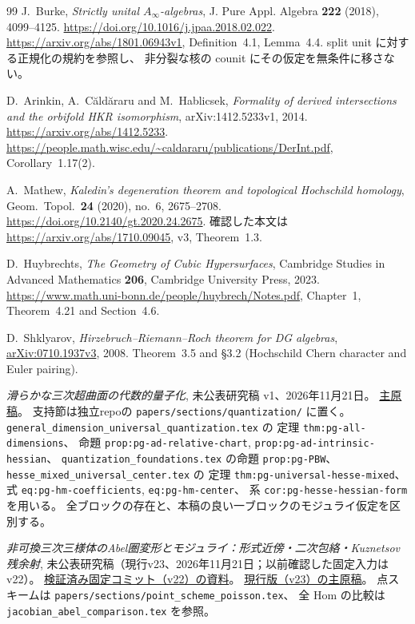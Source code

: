 \begin{thebibliography}{99}
J.~Burke,
\emph{Strictly unital $A_\infty$-algebras},
J. Pure Appl. Algebra \textbf{222} (2018), 4099--4125.
\url{https://doi.org/10.1016/j.jpaa.2018.02.022}.
\url{https://arxiv.org/abs/1801.06943v1},
Definition~4.1, Lemma~4.4.
split unit に対する正規化の規約を参照し、
非分裂な核の counit にその仮定を無条件に移さない。

D.~Arinkin, A.~C\u{a}ld\u{a}raru and M.~Hablicsek,
\emph{Formality of derived intersections and the orbifold HKR isomorphism},
arXiv:1412.5233v1, 2014.
\url{https://arxiv.org/abs/1412.5233}.
\url{https://people.math.wisc.edu/~caldararu/publications/DerInt.pdf},
Corollary~1.17(2).

A.~Mathew,
\emph{Kaledin's degeneration theorem and topological Hochschild homology},
Geom.\ Topol.\ \textbf{24} (2020), no.~6, 2675--2708.
\url{https://doi.org/10.2140/gt.2020.24.2675}.
確認した本文は \url{https://arxiv.org/abs/1710.09045}, v3,
Theorem~1.3.

D.~Huybrechts,
\emph{The Geometry of Cubic Hypersurfaces},
Cambridge Studies in Advanced Mathematics \textbf{206},
Cambridge University Press, 2023.
\url{https://www.math.uni-bonn.de/people/huybrech/Notes.pdf},
Chapter~1, Theorem~4.21 and Section~4.6.

D.~Shklyarov,
\emph{Hirzebruch--Riemann--Roch theorem for DG algebras},
\href{https://arxiv.org/abs/0710.1937}{arXiv:0710.1937v3}, 2008.
Theorem~3.5 and \S3.2 (Hochschild Chern character and Euler pairing).

\emph{滑らかな三次超曲面の代数的量子化},
未公表研究稿 v1、2026年11月21日。
\href{https://github.com/uedakazushi/cubic-quantization/blob/main/papers/cubic-quantization.tex}{主原稿}。
支持節は独立repoの \texttt{papers/sections/quantization/} に置く。
\texttt{general\_dimension\_universal\_quantization.tex} の
定理 \texttt{thm:pg-all-dimensions}、
命題 \texttt{prop:pg-ad-relative-chart}, \texttt{prop:pg-ad-intrinsic-hessian}、
\texttt{quantization\_foundations.tex} の命題 \texttt{prop:pg-PBW}、
\texttt{hesse\_mixed\_universal\_center.tex} の
定理 \texttt{thm:pg-universal-hesse-mixed}、
式 \texttt{eq:pg-hm-coefficients}, \texttt{eq:pg-hm-center}、
系 \texttt{cor:pg-hesse-hessian-form}を用いる。
全ブロックの存在と、本稿の良い一ブロックのモジュライ仮定を区別する。

\emph{非可換三次三様体のAbel圏変形とモジュライ：形式近傍・二次包絡・Kuznetsov残余射},
未公表研究稿（現行v23、2026年11月21日；以前確認した固定入力はv22）。
\href{https://github.com/uedakazushi/nc-cubic-threefold/tree/6c35d2c84671c2538e61836a6bf3a511392eacce}{検証済み固定コミット（v22）の資料}。
\href{https://github.com/uedakazushi/nc-cubic-threefold/blob/main/papers/nc-cubic-threefold.tex}{現行版（v23）の主原稿}。
点スキームは \texttt{papers/sections/point\_scheme\_poisson.tex}、
全 Hom の比較は \texttt{jacobian\_abel\_comparison.tex} を参照。


\end{thebibliography}
